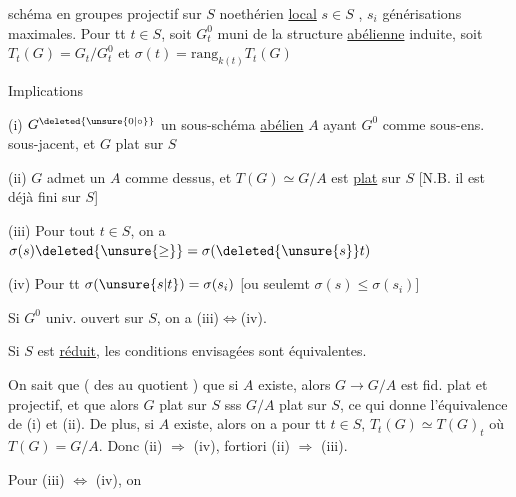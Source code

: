 schéma en groupes  projectif sur $S$  noethérien \uline{local}
$s\in S$ , $s_i$ générisations maximales.
Pour tt $t\in S$, soit $G_t^0$ muni de la structure \uline{abélienne} induite, soit $T_t(G)=G_t/G_t^0$
et $\sigma(t)=\mathrm{rang}_{k(t)}T_t(G)$

Implications

(i)  $G^{\deleted{\unsure{0|\circ}}}$  un sous-schéma \uline{abélien} $A$ ayant
$G^0$ comme sous-ens. sous-jacent, et $G$ plat sur $S$

\margin{$\Updownarrow$}(ii) $G$ admet un $A$ comme dessus, et $T(G)\simeq G/A$ est
\uline{plat} sur $S$ [N.B. il est déjà fini sur $S$]

\margin{$\Downarrow$}(iii) Pour tout $t\in S$, on a  $\sigma(s)\deleted{\unsure{\geq}}=\sigma(\deleted{\unsure{s}}t)$ 

\margin{$\Updownarrow$}(iv) Pour tt   $\sigma(\unsure{s|t})=\sigma(s_i)$ [ou seulemt $\sigma(s)\leq\sigma(s_i)$]

Si $G^0$ univ. ouvert sur $S$,  on a \textup{(iii)}$\Longleftrightarrow$\textup{(iv)}.

Si  $S$ est \uline{réduit},  les conditions envisagées sont équivalentes.

On sait que ( des  au quotient ) que si $A$
existe, alors $G\longrightarrow G/A$ est fid. plat et projectif, et que
alors $G$ plat sur $S$ sss $G/A$ plat sur $S$, ce qui donne
l'équivalence de (i) et (ii). De plus, si $A$ existe, alors
on a pour tt $t\in S$, $T_t(G)\simeq T(G)_t$ où $T(G)=G/A$.
Donc (ii) $\Longrightarrow$ (iv),  fortiori (ii) $\Longrightarrow$ (iii).

Pour (iii) $\Longleftrightarrow$ (iv), on 

